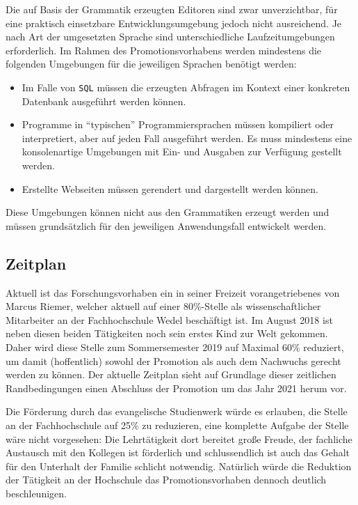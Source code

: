 \documentclass[paper=a4,fontsize=11pt,parskip=half]{scrartcl}
\begin{document}
Die auf Basis der Grammatik erzeugten Editoren sind zwar unverzichtbar, für eine praktisch einsetzbare Entwicklungsumgebung jedoch nicht ausreichend. Je nach Art der umgesetzten Sprache sind unterschiedliche Laufzeitumgebungen erforderlich. Im Rahmen des Promotionsvorhabens werden mindestens die folgenden Umgebungen für die jeweiligen Sprachen benötigt werden:

\begin{itemize}
\item Im Falle von \texttt{SQL} müssen die erzeugten Abfragen im Kontext einer konkreten Datenbank ausgeführt werden können.
\item Programme in \enquote{typischen} Programmiersprachen müssen kompiliert oder interpretiert, aber auf jeden Fall ausgeführt werden. Es muss mindestens eine konsolenartige Umgebungen mit Ein- und Ausgaben zur Verfügung gestellt werden.
\item Erstellte Webseiten müssen gerendert und dargestellt werden können.
\end{itemize}

Diese Umgebungen können nicht aus den Grammatiken erzeugt werden und müssen grundsätzlich für den jeweiligen Anwendungsfall entwickelt werden.

\subsection{Zeitplan}

Aktuell ist das Forschungsvorhaben ein in seiner Freizeit vorangetriebenes von Marcus Riemer, welcher aktuell auf einer 80\%-Stelle als wissenschaftlicher Mitarbeiter an der Fachhochschule Wedel beschäftigt ist. Im August 2018 ist neben diesen beiden Tätigkeiten noch sein erstes Kind zur Welt gekommen. Daher wird diese Stelle zum Sommersemester 2019 auf Maximal 60\% reduziert, um damit (hoffentlich) sowohl der Promotion als auch dem Nachwuchs gerecht werden zu können. Der aktuelle Zeitplan sieht auf Grundlage dieser zeitlichen Randbedingungen einen Abschluss der Promotion um das Jahr 2021 herum vor.

Die Förderung durch das evangelische Studienwerk würde es erlauben, die Stelle an der Fachhochschule auf 25\% zu reduzieren, eine komplette Aufgabe der Stelle wäre nicht vorgesehen: Die Lehrtätigkeit dort bereitet große Freude, der fachliche Austausch mit den Kollegen ist förderlich und schlussendlich ist auch das Gehalt für den Unterhalt der Familie schlicht notwendig. Natürlich würde die Reduktion der Tätigkeit an der Hochschule das Promotionsvorhaben dennoch deutlich beschleunigen.
\end{document}
